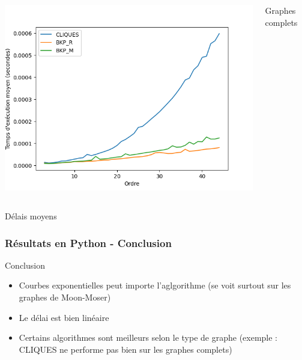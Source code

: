 \documentclass{beamer}
\begin{document}
\begin{frame}
\begin{columns}
    \includegraphics[width=\textwidth]{images/delay_pivot_complete_plot.png}
    \caption{Graphes complets}
  \end{columns}
  \begin{center}
    Délais moyens
  \end{center}
\end{frame}

\begin{frame}
\frametitle{Résultats en Python - Conclusion}
\begin{block}{Conclusion}
\begin{itemize}
  \item Courbes exponentielles peut importe l'aglgorithme (se voit surtout sur les graphes de Moon-Moser)
  \item Le délai est bien linéaire
  \item Certains algorithmes sont meilleurs selon le type de graphe (exemple : CLIQUES ne performe pas bien sur les graphes complets)
\end{itemize}
\end{block}
\end{frame}
\end{document}
